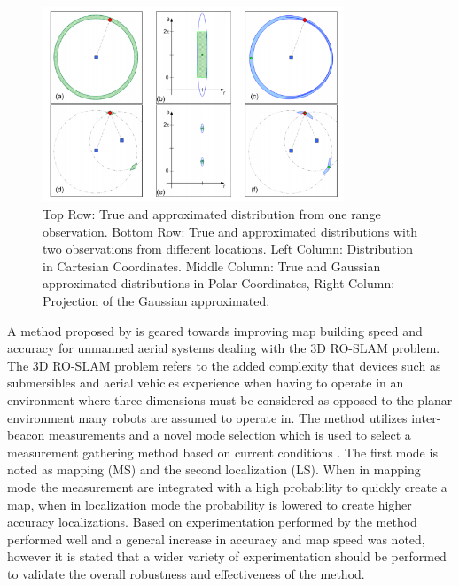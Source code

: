 \documentclass[conference]{IEEEtran}
\begin{document}
	\begin{figure}[h!]
		
		\centering
		
		\includegraphics[width=90mm]{ROP_djugash.png}
		
		\caption{Top Row: True and approximated distribution from one range observation. Bottom Row: True and approximated distributions with two observations from different locations. Left Column: Distribution in Cartesian Coordinates. Middle Column: True and Gaussian approximated distributions in Polar Coordinates, Right Column: Projection of the Gaussian approximated. \cite{Djugash2008}} 
		
		\label{ROP_djugash}
		
	\end{figure}
	

	
	
	
	
	
	A method proposed by \cite{Dios2015} is geared towards improving map building speed and accuracy for unmanned aerial systems dealing with the 3D RO-SLAM problem. The 3D RO-SLAM problem refers to the added complexity that devices such as submersibles \cite{Newman} and aerial vehicles experience when having to operate in an environment where three dimensions must be considered as opposed to the planar environment many robots are assumed to operate in. The method utilizes inter-beacon measurements and a novel mode selection which is used to select a measurement gathering method based on current conditions \cite{Dios2015}. The first mode is noted as mapping (MS) and the second localization (LS). When in mapping mode the measurement are integrated with a high probability to quickly create a map, when in localization mode the probability is lowered to create higher accuracy localizations. Based on experimentation performed by \cite{Dios2015} the method performed well and a general increase in accuracy and map speed was noted, however it is stated that a wider variety of experimentation should be performed to validate the overall robustness and effectiveness of the method.
	
\end{document}
